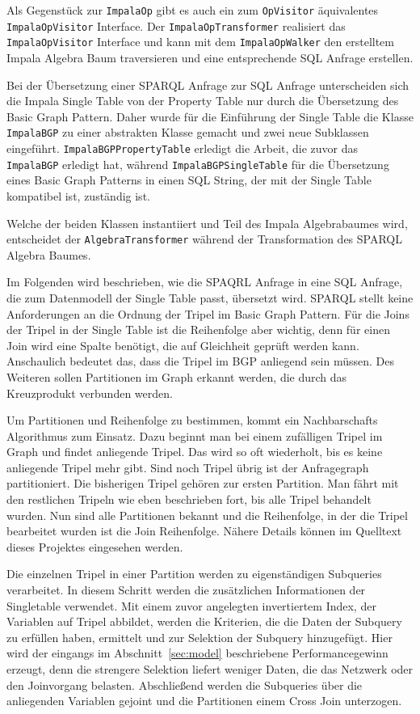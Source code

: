 \documentclass[
  a4paper,
  12pt,
  oneside,
  parskip=half,
  headsepline,
]{scrartcl}
\begin{document}
Als Gegenstück zur \texttt{ImpalaOp} gibt es auch ein zum \texttt{OpVisitor}
äquivalentes \texttt{Im\-pa\-la\-Op\-Vi\-si\-tor} Interface. Der
\texttt{ImpalaOpTransformer} realisiert das \texttt{Im\-pa\-la\-Op\-Vi\-si\-tor} Interface
und kann mit dem \texttt{ImpalaOpWalker} den erstelltem Impala Algebra Baum
traversieren und eine entsprechende SQL Anfrage erstellen.

Bei der Übersetzung einer SPARQL Anfrage zur SQL Anfrage unterscheiden sich die
Impala Single Table von der Property Table nur durch die Übersetzung des Basic
Graph Pattern. Daher wurde für die Einführung der Single Table die Klasse
\texttt{ImpalaBGP} zu einer abstrakten Klasse gemacht und zwei neue Subklassen
eingeführt. \texttt{Im\-pa\-la\-BGP\-Pro\-per\-ty\-Ta\-ble} erledigt die Arbeit,
die zuvor das \texttt{ImpalaBGP} erledigt hat, während
\texttt{Im\-pa\-la\-BGP\-Sin\-gle\-Ta\-ble} für die Übersetzung eines Basic
Graph Patterns in einen SQL String, der mit der Single Table kompatibel ist,
zuständig ist.

Welche der beiden Klassen instantiiert und Teil des Impala Algebrabaumes wird,
entscheidet der \texttt{AlgebraTransformer} während der Transformation des
SPARQL Algebra Baumes.

Im Folgenden wird beschrieben, wie die SPAQRL Anfrage in eine SQL Anfrage, die
zum Datenmodell der Single Table passt, übersetzt wird. SPARQL stellt keine
Anforderungen an die Ordnung der Tripel im Basic Graph Pattern. Für die Joins der
Tripel in der Single Table ist die Reihenfolge aber wichtig, denn für einen Join
wird eine Spalte benötigt, die auf Gleichheit geprüft werden kann. Anschaulich 
bedeutet das, dass die Tripel im BGP anliegend sein müssen. Des Weiteren sollen
Partitionen im Graph erkannt werden, die durch das Kreuzprodukt verbunden werden.

Um Partitionen und Reihenfolge zu bestimmen, kommt ein Nachbarschafts Algorithmus
zum Einsatz. Dazu beginnt man bei einem zufälligen Tripel im Graph und findet
anliegende Tripel. Das wird so oft wiederholt, bis es keine anliegende Tripel
mehr gibt. Sind noch Tripel übrig ist der Anfragegraph partitioniert. Die
bisherigen Tripel gehören zur ersten Partition. Man fährt mit den restlichen
Tripeln wie eben beschrieben fort, bis alle Tripel behandelt wurden. Nun sind
alle Partitionen bekannt und die Reihenfolge, in der die Tripel bearbeitet
wurden ist die Join Reihenfolge. Nähere Details können im Quelltext dieses
Projektes eingesehen werden.

Die einzelnen Tripel in einer Partition werden zu eigenständigen Subqueries
verarbeitet. In diesem Schritt werden die zusätzlichen Informationen der
Singletable verwendet. Mit einem zuvor angelegten invertiertem Index, der
Variablen auf Tripel abbildet, werden die Kriterien, die die Daten der
Subquery zu erfüllen haben, ermittelt und zur Selektion der Subquery
hinzugefügt. Hier wird der eingangs im Abschnitt~\ref{sec:model}
beschriebene Performancegewinn erzeugt, denn die strengere Selektion liefert
weniger Daten, die das Netzwerk oder den Joinvorgang belasten.
Abschließend werden die Subqueries über die anliegenden Variablen gejoint 
und die Partitionen einem Cross Join unterzogen.
\end{document}

